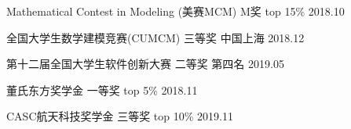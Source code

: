 
\begin{cvhonors}

  \cvhonor
    {Mathematical Contest in Modeling (美赛MCM)} %
    {M奖} %
    {top 15\%} %
    {2018.10} %

  \cvhonor
    {全国大学生数学建模竞赛(CUMCM)} %
    {三等奖} %
    {中国上海} %
    {2018.12} %

  \cvhonor
    {第十二届全国大学生软件创新大赛} %
    {二等奖} %
    {第四名} %
    {2019.05} %

  \cvhonor
    {董氏东方奖学金} %
    {一等奖} %
    {top 5\%} %
    {2018.11} %

  \cvhonor
    {CASC航天科技奖学金} %
    {三等奖} %
    {top 10\%} %
    {2019.11} %

\end{cvhonors}
